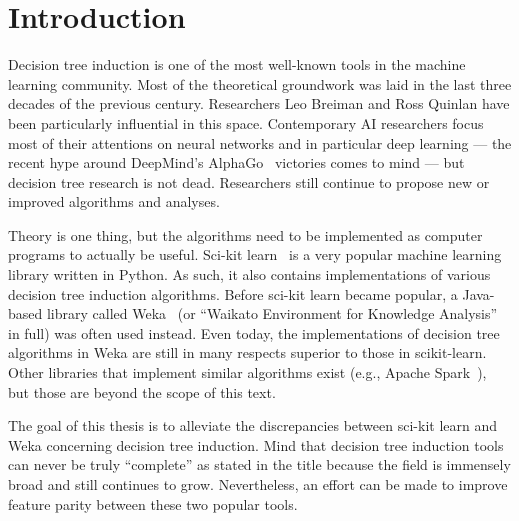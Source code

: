 
\chapter{Introduction}\label{cha:intro}


Decision tree induction is one of the most well-known tools in the machine learning community. Most of the theoretical groundwork was laid in the last three decades of the previous century. Researchers Leo Breiman and Ross Quinlan have been particularly influential in this space. Contemporary AI researchers focus most of their attentions on neural networks and in particular deep learning --- the recent hype around DeepMind's AlphaGo~\cite{alphago} victories comes to mind --- but decision tree research is not dead. Researchers still continue to propose new or improved algorithms and analyses.

Theory is one thing, but the algorithms need to be implemented as computer programs to actually be useful. Sci-kit learn~\cite{scikit-learn} is a very popular machine learning library written in Python. As such, it also contains implementations of various decision tree induction algorithms. Before sci-kit learn became popular, a Java-based library called Weka~\cite{eibe2016weka} (or ``Waikato Environment for Knowledge Analysis'' in full) was often used instead. Even today, the implementations of decision tree algorithms in Weka are still in many respects superior to those in scikit-learn. Other libraries that implement similar algorithms exist (e.g., Apache Spark~\cite{spark}), but those are beyond the scope of this text.

The goal of this thesis is to alleviate the discrepancies between sci-kit learn and Weka concerning decision tree induction. Mind that decision tree induction tools can never be truly ``complete'' as stated in the title because the field is immensely broad and still continues to grow. Nevertheless, an effort can be made to improve feature parity between these two popular tools.

